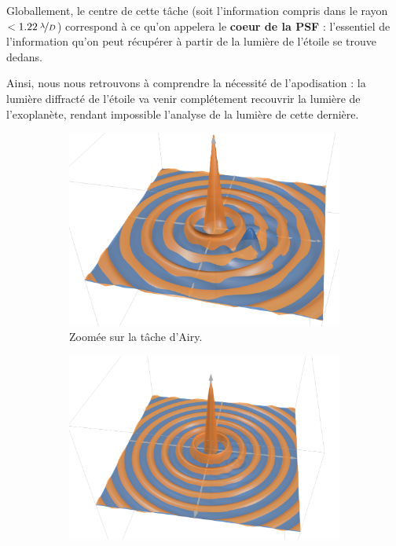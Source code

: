 Globallement, le centre de cette tâche (soit l'information compris dans le rayon $< 1.22\: \nicefrac{\lambda}{D}$) correspond à ce qu'on appelera le \textbf{coeur de la PSF} : l'essentiel de l'information qu'on peut récupérer à partir de la lumière de l'étoile se trouve dedans.



Ainsi, nous nous retrouvons à comprendre la nécessité de l'apodisation : la lumière diffracté de l'étoile va venir complétement recouvrir la lumière de l'exoplanète, rendant impossible l'analyse de la lumière de cette dernière. 


\begin{figure}[htbp]
    \centering
    \begin{subfigure}[b]{0.45\textwidth}
        \centering
        \includegraphics[width=\textwidth]{figures/st_pl_sgn.png}
        \caption{Zoomée sur la tâche d'Airy.}
    \end{subfigure}
    \hfill
    \begin{subfigure}[b]{0.45\textwidth}
        \centering
        \includegraphics[width=\textwidth]{figures/larg_st_pl_sgn.png}

\end{subfigure}
\end{figure}
